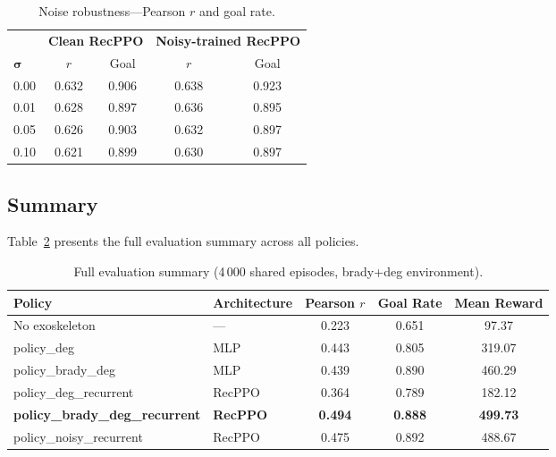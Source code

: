 \documentclass{article}
\begin{document}
\begin{table}[tbp]
  \centering
  \caption{Noise robustness---Pearson $r$ and goal rate.}
  \label{tab:noise}
  \begin{tabular}{lcccc}
    \toprule
    & \multicolumn{2}{c}{\textbf{Clean RecPPO}}
    & \multicolumn{2}{c}{\textbf{Noisy-trained RecPPO}} \\
    \cmidrule(r){2-3}\cmidrule(l){4-5}
    $\boldsymbol{\sigma}$ & $r$ & Goal & $r$ & Goal \\
    \midrule
    0.00 & 0.632 & 0.906 & 0.638 & 0.923 \\
    0.01 & 0.628 & 0.897 & 0.636 & 0.895 \\
    0.05 & 0.626 & 0.903 & 0.632 & 0.897 \\
    0.10 & 0.621 & 0.899 & 0.630 & 0.897 \\
    \bottomrule
  \end{tabular}
\end{table}

\subsection{Summary}

Table~\ref{tab:summary} presents the full evaluation summary across all
policies.

\begin{table}[tbp]
  \centering
  \caption{Full evaluation summary (4\,000 shared episodes, brady+deg
    environment).}
  \label{tab:summary}
  \small
  \begin{tabular}{llccc}
    \toprule
    \textbf{Policy} & \textbf{Architecture} & \textbf{Pearson $r$}
      & \textbf{Goal Rate} & \textbf{Mean Reward} \\
    \midrule
    No exoskeleton   & ---          & 0.223 & 0.651 &  97.37 \\
    policy\_deg      & MLP          & 0.443 & 0.805 & 319.07 \\
    policy\_brady\_deg & MLP        & 0.439 & 0.890 & 460.29 \\
    policy\_deg\_recurrent & RecPPO & 0.364 & 0.789 & 182.12 \\
    \textbf{policy\_brady\_deg\_recurrent}
                     & \textbf{RecPPO} & \textbf{0.494}
                     & \textbf{0.888} & \textbf{499.73} \\
    policy\_noisy\_recurrent & RecPPO & 0.475 & 0.892 & 488.67 \\
    \bottomrule
  \end{tabular}
\end{table}
\end{document}
